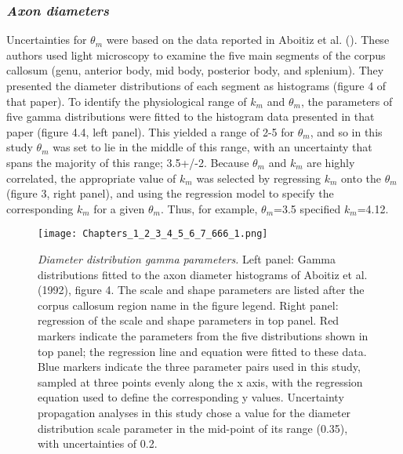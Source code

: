 

\subsubsection*{\textit{Axon diameters}}

Uncertainties for $\theta_{m}$ were based on the data reported in Aboitiz et al. (). These authors used light microscopy to examine the five main segments of the corpus callosum (genu, anterior body, mid body, posterior body, and splenium). They presented the diameter distributions of each segment as histograms (figure 4 of that paper). To identify the physiological range of $k_{m}$ and $\theta_{m}$, the parameters of five gamma distributions were fitted to the histogram data presented in that paper (figure 4.4, left panel). This yielded a range of 2-5 for $\theta_{m}$, and so in this study $\theta_{m}$ was set to lie in the middle of this range, with an uncertainty that spans the majority of this range; 3.5+/-2. Because $\theta_{m}$ and $k_{m}$ are highly correlated, the appropriate value of $k_{m}$ was selected by regressing $k_{m}$ onto the $\theta_{m}$ (figure 3, right panel), and
using the regression model to specify the corresponding $k_{m}$ for a given $\theta_{m}$. Thus, for example, $\theta_m$=3.5 specified $k_m$=4.12.



\begin{figure}[h!]
\begin{center}
\texttt{[image: Chapters\_1\_2\_3\_4\_5\_6\_7\_666\_1.png]}%
\end{center}
\caption[\emph{Diameter distribution gamma parameters. }]{\emph{Diameter distribution gamma parameters. }Left panel: Gamma distributions fitted to the axon diameter histograms of Aboitiz et al. (1992), 
figure 4. The scale and shape parameters are listed after the corpus callosum region name 
in the figure legend. Right panel: regression of the scale and shape parameters in top panel. 
Red markers indicate the parameters from the five distributions shown in top panel;
the regression line and equation were fitted to these data. Blue markers indicate the 
three parameter pairs used in this study, sampled at three points evenly along the x axis, with the regression equation used to define the corresponding y values.  Uncertainty propagation analyses in this study chose a value for the diameter distribution  scale parameter in the mid-point of its range (0.35), with uncertainties of 0.2.}\label{fig:4}
\end{figure}



